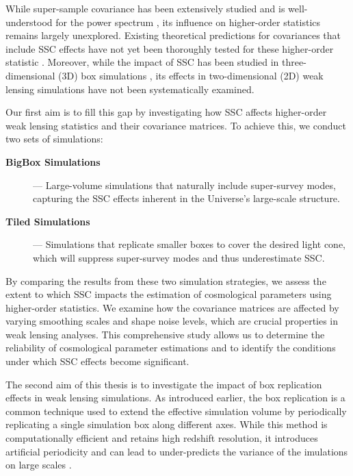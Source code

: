 While super-sample covariance has been extensively studied and is well-understood for the power spectrum \citep{PhysRevD.87.123504, 2017JCAP...11..051B, 2018JCAP...06..015B}, its influence on higher-order statistics remains largely unexplored. Existing theoretical predictions for covariances that include SSC effects \citep{2023A&A...672A.185L, 2023OJAp....6E...1U} have not yet been thoroughly tested for these higher-order statistic \citep{2023A&A...675A.120E}. Moreover, while the impact of SSC has been studied in three-dimensional (3D) box simulations \citep{PhysRevD.108.043521}, its effects in two-dimensional (2D) weak lensing simulations have not been systematically examined.

Our first aim is to fill this gap by investigating how SSC affects higher-order weak lensing statistics and their covariance matrices. To achieve this, we conduct two sets of simulations:
\begin{description}
    \item[\textbf{BigBox Simulations}] --- Large-volume simulations that naturally include super-survey modes, capturing the SSC effects inherent in the Universe's large-scale structure.
    \item[\textbf{Tiled Simulations}] --- Simulations that replicate smaller boxes to cover the desired light cone, which will suppress super-survey modes and thus underestimate SSC.
\end{description}
By comparing the results from these two simulation strategies, we assess the extent to which SSC impacts the estimation of cosmological parameters using higher-order statistics. We examine how the covariance matrices are affected by varying smoothing scales and shape noise levels, which are crucial properties in weak lensing analyses. This comprehensive study allows us to determine the reliability of cosmological parameter estimations and to identify the conditions under which SSC effects become significant.

The second aim of this thesis is to investigate the impact of box replication effects in weak lensing simulations. As introduced earlier, the box replication is a common technique used to extend the effective simulation volume by periodically replicating a single simulation box along different axes. While this method is computationally efficient and retains high redshift resolution, it introduces artificial periodicity and can lead to under-predicts the variance of the imulations on large scales \citep{2021JCAP...01..028Z}.

